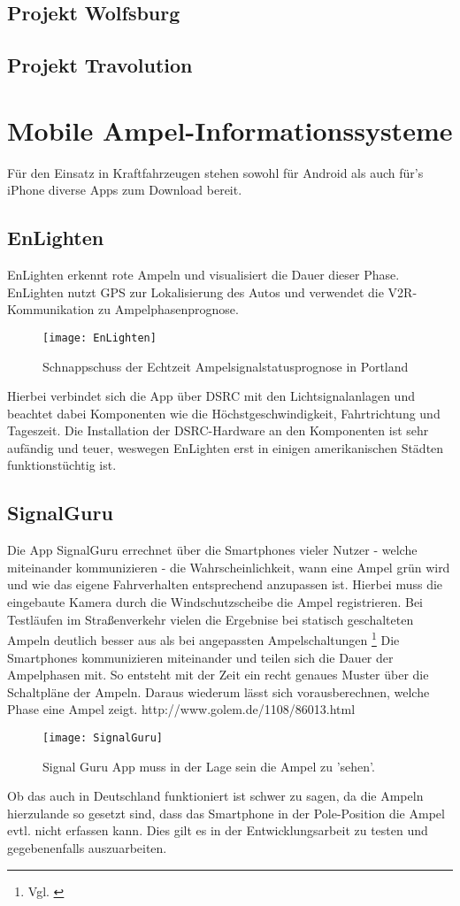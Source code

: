 \subsection{Projekt Wolfsburg}
\subsection{Projekt Travolution}
\section{Mobile Ampel-Informationssysteme}
Für den Einsatz in Kraftfahrzeugen stehen sowohl für Android als auch für's iPhone diverse Apps zum Download bereit. 
\subsection{EnLighten}
EnLighten erkennt rote Ampeln und visualisiert die Dauer dieser Phase.  
EnLighten nutzt \gls{GPS} zur Lokalisierung des Autos und verwendet die \gls{V2R}-Kommunikation zu Ampelphasenprognose.
\begin{figure}[h]
    \centering
    \texttt{[image: EnLighten]}
    \label{fig:Ampelsignalstatus}
    \caption[Echtzeit Ampelsignalstatus]{Schnappschuss der Echtzeit Ampelsignalstatusprognose in Portland}
\end{figure}
Hierbei verbindet sich die App über \gls{DSRC} mit den Lichtsignalanlagen und beachtet dabei Komponenten wie die Höchstgeschwindigkeit, Fahrtrichtung und Tageszeit.
Die Installation der \gls{DSRC}-Hardware an den Komponenten ist sehr aufändig und teuer, weswegen EnLighten erst in einigen amerikanischen Städten funktionstüchtig ist.
\subsection{SignalGuru}
Die App SignalGuru errechnet über die Smartphones vieler Nutzer - welche miteinander kommunizieren -  die Wahrscheinlichkeit, wann eine Ampel grün wird und wie das eigene Fahrverhalten entsprechend anzupassen ist. Hierbei muss die eingebaute Kamera durch die Windschutzscheibe die Ampel registrieren. Bei Testläufen im Straßenverkehr vielen die Ergebnise bei statisch geschalteten Ampeln deutlich besser aus als bei angepassten Ampelschaltungen \footnote{Vgl. \cite{SignalGuru}} 
Die Smartphones kommunizieren miteinander und teilen sich die Dauer der Ampelphasen mit. So entsteht mit der Zeit ein recht genaues Muster über die Schaltpläne der Ampeln. Daraus wiederum lässt sich vorausberechnen, welche Phase eine Ampel zeigt.
http://www.golem.de/1108/86013.html
\begin{figure}[h]
    \centering
    \texttt{[image: SignalGuru]}
    \caption[Signal Guru]{Signal Guru App muss in der Lage sein die Ampel zu 'sehen'.  \cite{SignalGuruPaper}}
    \label{fig:AbbSignalGuru}
\end{figure}
Ob das auch in Deutschland funktioniert ist schwer zu sagen, da die Ampeln hierzulande so gesetzt sind, dass das Smartphone in der Pole-Position die Ampel evtl. nicht erfassen kann. Dies gilt es in der Entwicklungsarbeit zu testen und gegebenenfalls auszuarbeiten.
